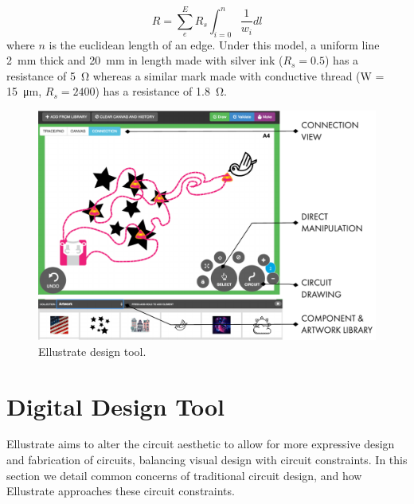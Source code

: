\documentclass{sigchi}
\begin{document}
    \begin{equation}
        R =  \sum^{E}_e R_s \int_{i=0}^{n}  \frac{1}{w_i} dl
    \label{eq:resistance}
    \end{equation}
    where $n$ is the euclidean length of an edge. Under this model, a uniform line \SI{2}{\milli\metre} thick and \SI{20}{\milli\metre} in length made with silver ink ($R_s = 0.5$) has a resistance of \SI{5}{\ohm} whereas a similar mark made with conductive thread (W = \SI{15}{\micro\metre}, $R_s = 2400$) has a resistance of \SI{1.8}{\ohm}.




\begin{figure}[t]
\centering
\includegraphics[width=1.0\columnwidth]{figures/designtool.pdf}
\caption{Ellustrate design tool. }
\label{fig:design_tool}
\end{figure}
\section{Digital Design Tool}
    Ellustrate aims to alter the circuit aesthetic to allow for more expressive design and fabrication of circuits, balancing visual design with circuit constraints. In this section we detail common concerns of traditional circuit design, and how Ellustrate approaches these circuit constraints.
\end{document}
